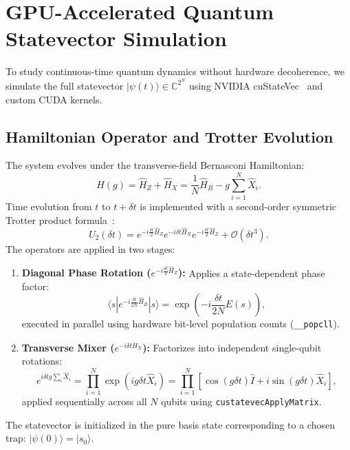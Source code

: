 \documentclass[12pt,a4paper]{report}
\begin{document}
\section{GPU-Accelerated Quantum Statevector Simulation}
\label{sec:gpu_simulation}
To study continuous-time quantum dynamics without hardware decoherence, we simulate the full statevector $|\psi(t)\rangle \in \mathbb{C}^{2^N}$ using NVIDIA cuStateVec~\cite{custatevec} and custom CUDA kernels.

\subsection{Hamiltonian Operator and Trotter Evolution}
The system evolves under the transverse-field Bernasconi Hamiltonian:
\begin{equation}
    \hat{H}(g) = \hat{H}_Z + \hat{H}_X = \frac{1}{N}\hat{H}_B - g \sum_{i=1}^N \hat{X}_i.
\end{equation}
Time evolution from $t$ to $t + \delta t$ is implemented with a second-order symmetric Trotter product formula~\cite{trotter1959, suzuki1976, childs2021}:
\begin{equation}
    \hat{U}_2(\delta t) = e^{-i \frac{\delta t}{2} \hat{H}_Z} e^{-i \delta t \hat{H}_X} e^{-i \frac{\delta t}{2} \hat{H}_Z} + \mathcal{O}(\delta t^3).
    \label{eq:trotter_step}
\end{equation}
The operators are applied in two stages:
\begin{enumerate}
    \item \textbf{Diagonal Phase Rotation ($e^{-i \frac{\delta t}{2} \hat{H}_Z}$):} Applies a state-dependent phase factor:
    \begin{equation}
        \langle s | e^{-i \frac{\delta t}{2N}\hat{H}_B} |s\rangle = \exp\left( -i \frac{\delta t}{2N} E(s) \right),
    \end{equation}
    executed in parallel using hardware bit-level population counts (\verb|__popcll|).
    \item \textbf{Transverse Mixer ($e^{-i \delta t \hat{H}_X}$):} Factorizes into independent single-qubit rotations:
    \begin{equation}
        e^{i \delta t g \sum_i \hat{X}_i} = \prod_{i=1}^N \exp\left( i g \delta t \hat{X}_i \right) = \prod_{i=1}^N \left[ \cos(g \delta t) \hat{I} + i \sin(g \delta t) \hat{X}_i \right],
    \end{equation}
    applied sequentially across all $N$ qubits using \texttt{custatevecApplyMatrix}.
\end{enumerate}
The statevector is initialized in the pure basis state corresponding to a chosen trap: $|\psi(0)\rangle = |s_0\rangle$.
\end{document}
